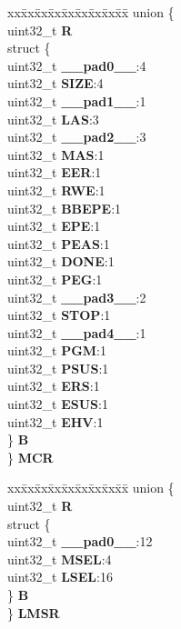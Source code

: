 \begin{DoxyCompactItemize}
\begin{tabbing}
\end{tabbing}\item 
\mbox{\label{structFLASH__tag_aab1757fcda7ab352bef58aa0c7e7e07a}} 
\begin{tabbing}
xx\=xx\=xx\=xx\=xx\=xx\=xx\=xx\=xx\=\kill
union \{\\
\>uint32\_t {\bfseries R}\\
\>struct \{\\
\>\>uint32\_t {\bfseries \_\_pad0\_\_}:4\\
\>\>uint32\_t {\bfseries SIZE}:4\\
\>\>uint32\_t {\bfseries \_\_pad1\_\_}:1\\
\>\>uint32\_t {\bfseries LAS}:3\\
\>\>uint32\_t {\bfseries \_\_pad2\_\_}:3\\
\>\>uint32\_t {\bfseries MAS}:1\\
\>\>uint32\_t {\bfseries EER}:1\\
\>\>uint32\_t {\bfseries RWE}:1\\
\>\>uint32\_t {\bfseries BBEPE}:1\\
\>\>uint32\_t {\bfseries EPE}:1\\
\>\>uint32\_t {\bfseries PEAS}:1\\
\>\>uint32\_t {\bfseries DONE}:1\\
\>\>uint32\_t {\bfseries PEG}:1\\
\>\>uint32\_t {\bfseries \_\_pad3\_\_}:2\\
\>\>uint32\_t {\bfseries STOP}:1\\
\>\>uint32\_t {\bfseries \_\_pad4\_\_}:1\\
\>\>uint32\_t {\bfseries PGM}:1\\
\>\>uint32\_t {\bfseries PSUS}:1\\
\>\>uint32\_t {\bfseries ERS}:1\\
\>\>uint32\_t {\bfseries ESUS}:1\\
\>\>uint32\_t {\bfseries EHV}:1\\
\>\} {\bfseries B}\\
\} {\bfseries MCR}\\

\end{tabbing}\item 
\mbox{\label{structFLASH__tag_a1621dbb8208335611701e9126223f6e4}} 
\begin{tabbing}
xx\=xx\=xx\=xx\=xx\=xx\=xx\=xx\=xx\=\kill
union \{\\
\>uint32\_t {\bfseries R}\\
\>struct \{\\
\>\>uint32\_t {\bfseries \_\_pad0\_\_}:12\\
\>\>uint32\_t {\bfseries MSEL}:4\\
\>\>uint32\_t {\bfseries LSEL}:16\\
\>\} {\bfseries B}\\
\} {\bfseries LMSR}\\


\end{tabbing}
\end{DoxyCompactItemize}
